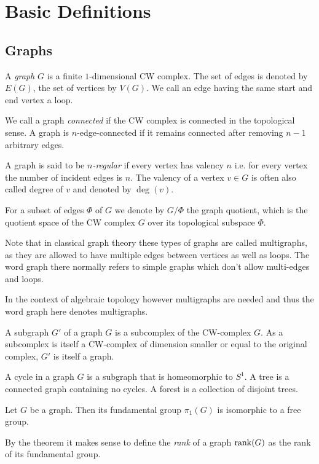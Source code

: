 \section{Basic Definitions}
\subsection{Graphs}
\begin{definition}
	A \emph{graph} $G$ is a finite $1$-dimensional CW complex. The set of edges is denoted by $E(G)$, the set of vertices by  $V(G)$.
	We call an edge having the same start and end vertex a loop.

	We call a graph \emph{connected} if the CW complex is connected in the topological sense.
	A graph is $n$-edge-connected if it remains connected after removing  $n-1$ arbitrary edges.

	A graph is said to be \emph{$n$-regular} if every vertex has valency $n$ i.e. for every vertex the number of incident edges is $n$.
	The valency of a vertex $v \in G$ is often also called degree of $v$ and denoted by $\deg(v)$.

	For a subset of edges $\Phi$ of $G$ we denote by $G / \Phi$ the graph quotient, which is the quotient space of the CW complex $G$ over its topological subspace $\Phi$.
\end{definition}

\begin{remark}
	Note that in classical graph theory these types of graphs are called multigraphs, as they are allowed to have multiple edges between vertices as well as loops.
	The word graph there normally refers to simple graphs which don't allow multi-edges and loops.

	In the context of algebraic topology however multigraphs are needed and thus the word graph here denotes multigraphs.
\end{remark}

\begin{definition}
	A subgraph $G'$ of a graph $G$ is a subcomplex of the CW-complex $G$. As a subcomplex is itself a CW-complex of dimension smaller or equal to the original complex,
	 $G'$ is itself a graph.

	A cycle in a graph $G$ is a subgraph that is homeomorphic to $S^1$. A tree is a
	connected graph containing no cycles. A forest is a collection of disjoint trees.
\end{definition}

\begin{theorem}\label{thm:fg_graph}
	Let $G$ be a graph. Then its fundamental group $\pi_{1}(G)$ is isomorphic to a free group.
\end{theorem}
By the theorem it makes sense to define the \emph{rank} of a graph $\rank(G)$ as the rank of its fundamental group.

